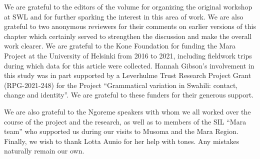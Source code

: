 \documentclass[output=paper,colorlinks,citecolor=brown,draftmode]{langscibook}
\begin{document}
We are grateful to the editors of the volume for organizing the original workshop at SWL and for further sparking the interest in this area of work. We are also grateful to two anonymous reviewers for their comments on earlier versions of this chapter which certainly served to strengthen the discussion and make the overall work clearer. We are grateful to the Kone Foundation for funding the Mara Project at the University of Helsinki from 2016 to 2021, including fieldwork trips during which data for this article were collected. Hannah Gibson’s involvement in this study was in part supported by a Leverhulme Trust Research Project Grant (RPG-2021-248) for the Project “Grammatical variation in Swahili: contact, change and identity”. We are grateful to these funders for their generous support.

We are also grateful to the Ngoreme speakers with whom we all worked over the course of the project and the research, as well as to members of the SIL “Mara team” who supported us during our visits to Musoma and the Mara Region. Finally, we wish to thank Lotta Aunio for her help with tones. Any mistakes naturally remain our own.
\end{document}
